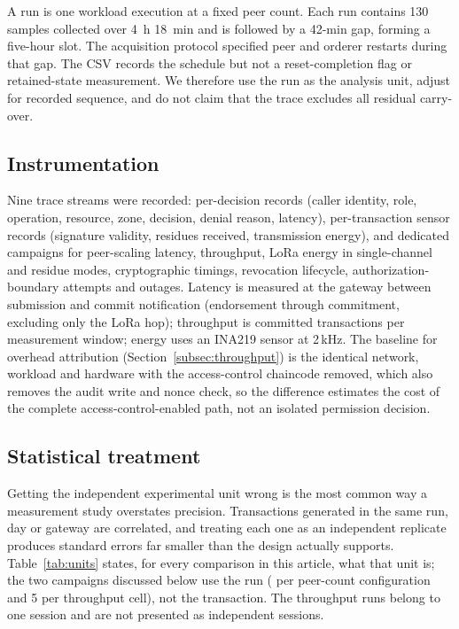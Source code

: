 \documentclass[a4paper,fleqn]{cas-sc}
\begin{document}
A run is one workload execution at a fixed peer count. Each run contains
130 samples collected over 4~h 18~min and is followed by a 42-min gap,
forming a five-hour slot. The acquisition protocol specified peer and
orderer restarts during that gap. The CSV records the schedule but not a
reset-completion flag or retained-state measurement. We therefore use the
run as the analysis unit, adjust for recorded sequence, and do not claim
that the trace excludes all residual carry-over.

\subsection{Instrumentation}
\label{subsec:instrumentation}

Nine trace streams were recorded: per-decision records (caller identity,
role, operation, resource, zone, decision, denial reason, latency),
per-transaction sensor records (signature validity, residues received,
transmission energy), and dedicated campaigns for peer-scaling latency,
throughput, LoRa energy in single-channel and residue modes,
cryptographic timings, revocation lifecycle, authorization-boundary
attempts and outages. Latency is measured at the gateway between
submission and commit notification (endorsement through commitment,
excluding only the LoRa hop); throughput is committed transactions per
measurement window; energy uses an INA219 sensor at 2\,kHz. The baseline
for overhead attribution (Section~\ref{subsec:throughput}) is the
identical network, workload and hardware with the access-control
chaincode removed, which also removes the audit write and nonce check, so
the difference estimates the cost of the complete access-control-enabled
path, not an isolated permission decision.

\subsection{Statistical treatment}
\label{subsec:stats}

Getting the independent experimental unit wrong is the most common way a
measurement study overstates precision. Transactions generated in the same
run, day or gateway are correlated, and treating each one as an independent
replicate produces standard errors far smaller than the design actually
supports. Table~\ref{tab:units} states, for every comparison in this
article, what that unit is; the two campaigns discussed below use the run
(\PartRunsPerConfig{} per peer-count configuration and 5 per throughput
cell), not the transaction. The throughput runs belong to one session and
are not presented as independent sessions.
\end{document}
